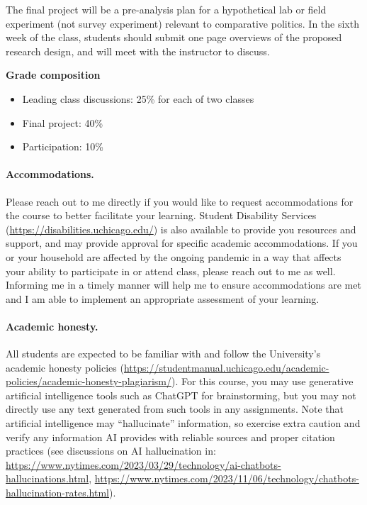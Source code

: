 \documentclass[letterpaper,12pt,parskip=full,DIV=10]{scrartcl}
\begin{document}
The final project will be a pre-analysis plan for a hypothetical lab or field experiment (not survey experiment) relevant to comparative politics. In the sixth week of the class, students should submit one page overviews of the proposed research design, and will meet with the instructor to discuss.

\textbf{Grade composition}

\begin{itemize}

\item Leading class discussions: 25\% for each of two classes

\item Final project: 40\%

\item Participation: 10\%

\end{itemize}

\paragraph{Accommodations.}

Please reach out to me directly if you would like to request accommodations for the course to better facilitate your learning. Student Disability Services (\url{https://disabilities.uchicago.edu/}) is also available to provide you resources and support, and may provide approval for specific academic accommodations. If you or your household are affected by the ongoing pandemic in a way that affects your ability to participate in or attend class, please reach out to me as well. Informing me in a timely manner will help me to ensure accommodations are met and I am able to implement an appropriate assessment of your learning.

\paragraph{Academic honesty.}

All students are expected to be familiar with and follow the University's academic honesty policies (\url{https://studentmanual.uchicago.edu/academic-policies/academic-honesty-plagiarism/}). For this course, you may use generative artificial intelligence tools such as ChatGPT for brainstorming, but you may not directly use any text generated from such tools in any assignments. Note that artificial intelligence may ``hallucinate'' information, so exercise extra caution and verify any information AI provides with reliable sources and proper citation practices
(see discussions on AI hallucination in: \url{https://www.nytimes.com/2023/03/29/technology/ai-chatbots-hallucinations.html}, \url{https://www.nytimes.com/2023/11/06/technology/chatbots-hallucination-rates.html}).
\end{document}
